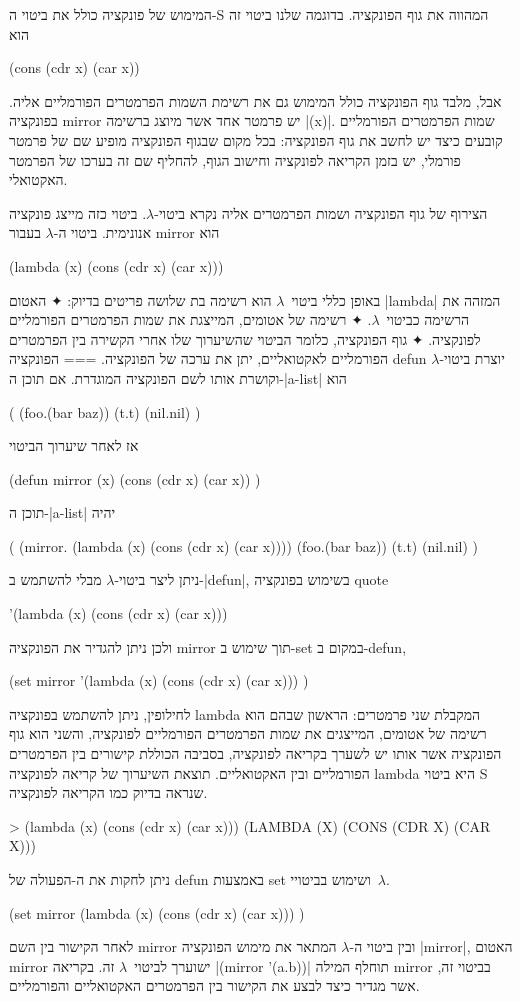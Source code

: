 \documentclass[a4paper,12pt,reqno]{article}
\begin{document}
המימוש של פונקציה כולל את ביטוי ה-S המהווה את גוף הפונקציה.
בדוגמה שלנו ביטוי זה הוא
\begin{LISP}
(cons (cdr x) (car x))
\end{LISP}
אבל, מלבד גוף הפונקציה כולל המימוש גם את רשימת השמות הפרמטרים הפורמליים אליה.
בפונקציה mirror יש פרמטר אחד אשר מיוצג ברשימה \T|(x)|.
שמות הפרמטרים הפורמליים קובעים כיצד יש לחשב את גוף הפונקציה: בכל מקום שבגוף
הפונקציה מופיע שם של פרמטר פורמלי, יש בזמן הקריאה לפונקציה וחישוב הגוף, להחליף
שם זה בערכו של הפרמטר האקטואלי.

הצירוף של גוף הפונקציה ושמות הפרמטרים אליה נקרא ביטוי-$λ$. ביטוי כזה
מייצג פונקציה אנונימית. ביטוי ה-$λ$ בעבור mirror הוא
\begin{LISP}
  (lambda (x) (cons (cdr x) (car x)))
\end{LISP}
באופן כללי ביטוי~$λ$ הוא רשימה בת שלושה פריטים בדיוק:
✦ האטום \T|lambda| המזהה את הרשימה כביטוי~$λ$.
✦ רשימה של אטומים, המייצגת את שמות הפרמטרים הפורמליים לפונקציה.
✦ גוף הפונקציה, כלומר הביטוי שהשיערוך שלו אחרי הקשירה בין הפרמטרים
הפורמליים לאקטואליים, יתן את ערכה של הפונקציה.
===
הפונקציה defun יוצרת ביטוי-$λ$ וקושרת אותו לשם הפונקציה המוגדרת.
אם תוכן ה-\E|a-list| הוא
\begin{LISP}
(
  (foo.(bar baz))
  (t.t)
  (nil.nil)
)
\end{LISP}
אז לאחר שיערוך הביטוי
\begin{LISP}
(defun
  mirror (x)
  (cons (cdr x) (car x))
)
\end{LISP}
תוכן ה-\E|a-list| יהיה
\begin{LISP}
(
  (mirror.
     (lambda (x)
        (cons (cdr x) (car x))))
  (foo.(bar baz))
  (t.t)
  (nil.nil)
)
\end{LISP}

ניתן ליצר ביטוי-$λ$ מבלי להשתמש ב-\E|defun|, בשימוש בפונקציה quote
\begin{LISP}
  '(lambda (x) (cons (cdr x) (car x)))
\end{LISP}
ולכן ניתן להגדיר את הפונקציה mirror תוך שימוש ב-set במקום ב-defun,
\begin{LISP}
(set mirror
  '(lambda (x)
      (cons (cdr x) (car x)))
)
\end{LISP}
לחילופין, ניתן להשתמש בפונקציה lambda המקבלת שני פרמטרים: הראשון שבהם הוא רשימה
של אטומים, המייצגים את שמות הפרמטרים הפורמליים לפונקציה, והשני הוא גוף הפונקציה
אשר אותו יש לשערך בקריאה לפונקציה, בסביבה הכוללת קישורים בין הפרמטרים הפורמליים
ובין האקטואליים. תוצאת השיערוך של קריאה לפונקציה lambda היא ביטוי S שנראה
בדיוק כמו הקריאה לפונקציה.
\begin{LISP}
> (lambda (x) (cons (cdr x) (car x)))
(LAMBDA (X) (CONS (CDR X) (CAR X)))
\end{LISP}
ניתן לחקות את ה-הפעולה של defun באמצעות set ושימוש בביטויי~$λ$.
\begin{LISP}
(set
  mirror
  (lambda (x) (cons (cdr x) (car x)))
)
\end{LISP}
לאחר הקישור בין השם mirror ובין ביטוי ה-$λ$ המתאר את מימוש הפונקציה \E|mirror|,
האטום mirror ישוערך לביטוי~$λ$ זה. בקריאה \T|(mirror '(a.b))| תוחלף המילה
mirror בביטוי זה, אשר מגדיר כיצד לבצע את הקישור בין הפרמטרים האקטואליים
והפורמליים.
\end{document}
